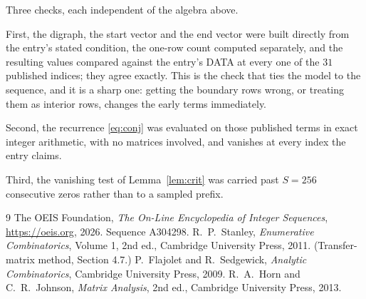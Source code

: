 \documentclass[11pt,a4paper]{article}
\theoremstyle{plain}
\theoremstyle{definition}
\begin{document}
Three checks, each independent of the algebra above.

First, the digraph, the start vector and the end vector were built directly from the
entry's stated condition, the one-row count computed separately, and the resulting values
compared against the entry's DATA at every one of the $31$ published indices; they
agree exactly. This is the check that ties the model to the sequence, and it is a sharp one:
getting the boundary rows wrong, or treating them as interior rows, changes the early terms
immediately.

Second, the recurrence \eqref{eq:conj} was evaluated on those published terms in exact
integer arithmetic, with no matrices involved, and vanishes at every index the entry claims.

Third, the vanishing test of Lemma~\ref{lem:crit} was carried past $S=256$ consecutive
zeros rather than to a sampled prefix.

\begin{thebibliography}{9}
 The OEIS Foundation, \emph{The On-Line Encyclopedia of Integer
Sequences}, \url{https://oeis.org}, 2026. Sequence A304298.
 R.~P.~Stanley, \emph{Enumerative Combinatorics}, Volume 1, 2nd ed.,
Cambridge University Press, 2011. (Transfer-matrix method, Section 4.7.)
 P.~Flajolet and R.~Sedgewick, \emph{Analytic Combinatorics}, Cambridge
University Press, 2009.
 R.~A.~Horn and C.~R.~Johnson, \emph{Matrix Analysis}, 2nd ed., Cambridge
University Press, 2013.
\end{thebibliography}
\end{document}

